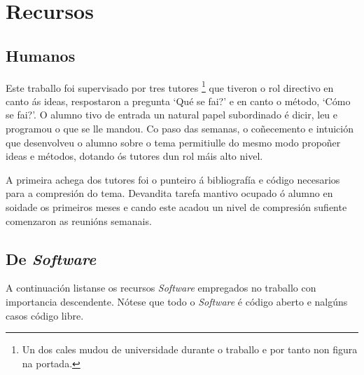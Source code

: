 \section{Recursos}
\subsection{Humanos}
Este traballo foi supervisado por tres tutores \footnote{Un dos cales mudou de universidade durante o traballo e por tanto non figura na portada.} que tiveron o rol directivo en canto ás ideas, respostaron a pregunta `Qué se fai?' e en canto o método, `Cómo se fai?'. O alumno tivo de entrada un natural papel subordinado é dicir, leu e programou o que se lle mandou. Co paso das semanas, o coñecemento e intuición que desenvolveu o alumno sobre o tema permitiulle do mesmo modo propoñer ideas e métodos, dotando ós tutores dun rol máis alto nivel.

A primeira achega dos tutores foi o punteiro á bibliografía e código necesarios para a compresión do tema. Devandita tarefa mantivo ocupado ó alumno en soidade os primeiros meses e cando este acadou un nivel de compresión sufiente comenzaron as reunións semanais.


\subsection{De \emph{Software}}

A continuación listanse os recursos \emph{Software} empregados no traballo con importancia descendente. Nótese que todo o \emph{Software} é código aberto e nalgúns casos código libre.


